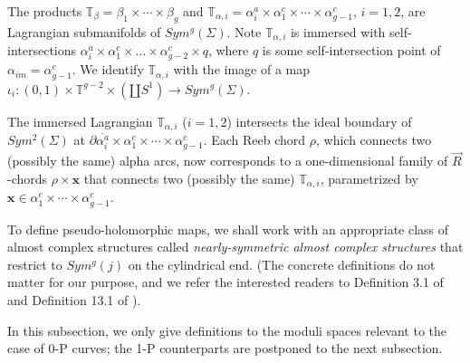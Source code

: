 \documentclass{amsart}
\theoremstyle{definition}
\theoremstyle{remark}
\numberwithin{equation}{section}
\numberwithin{equation}{section} \makeatletter
\begin{document}
The products $\mathbb{T}_\beta=\beta_1\times\cdots\times\beta_g$ and $\mathbb{T}_{\alpha,i}=\alpha^a_i\times \alpha^c_1\times\cdots\times\alpha^c_{g-1}$, $i=1,2$, are Lagrangian submanifolds of $Sym^g(\Sigma)$. Note $\mathbb{T}_{\alpha,i}$ is immersed with self-intersections $\alpha^a_i\times\alpha_1^c\times\ldots\times\alpha^c_{g-2}\times q$, where $q$ is some self-intersection point of $\alpha_{im}=\alpha_{g-1}^c$. We identify $\mathbb{T}_{\alpha,i}$ with the image of a map $\iota_i:(0,1)\times \mathbb{T}^{g-2} \times (\amalg S^1)\rightarrow Sym^g(\Sigma)$. 

The immersed Lagrangian $\mathbb{T}_{\alpha,i}$ ($i=1,2$) intersects the ideal boundary of $Sym^2(\Sigma)$ at $\partial\overline{\alpha^a_i} \times\alpha_1^c\times\cdots\times \alpha_{g-1}^c$. Each Reeb chord $\rho$, which connects two (possibly the same) alpha arcs, now corresponds to a one-dimensional family of $\overrightarrow{R}$-chords $\rho \times \bm{x}$ that connects two (possibly the same) $\mathbb{T}_{\alpha,i}$, parametrized by $\bm{x}\in \alpha_1^c\times\cdots\times \alpha_{g-1}^c$.  

To define pseudo-holomorphic maps, we shall work with an appropriate class of almost complex structures called \emph{nearly-symmetric almost complex structures} that restrict to $Sym^g(j)$ on the cylindrical end. (The concrete definitions do not matter for our purpose, and we refer the interested readers to Definition 3.1 of \cite{OS04} and Definition 13.1 of \cite{MR2240908}). 

In this subsection, we only give definitions to the moduli spaces relevant to the case of 0-P curves; the 1-P counterparts are postponed to the next subsection. 
\end{document}
